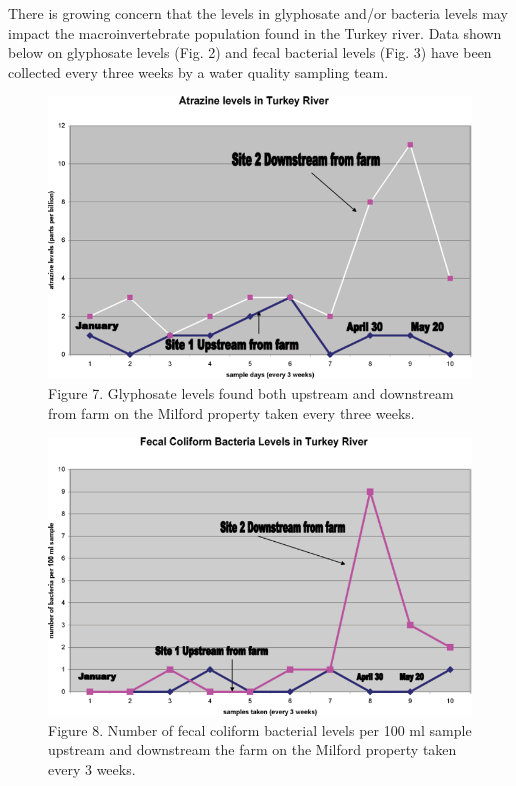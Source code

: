 \documentclass[
]{book}
\begin{document}
There is growing concern that the levels in glyphosate and/or bacteria levels may impact the macroinvertebrate population found in the Turkey river. Data shown below on glyphosate levels (Fig. 2) and fecal bacterial levels (Fig. 3) have been collected every three weeks by a water quality sampling team.

\begin{figure}
\centering
\includegraphics{images/figure7.png}
\caption{Figure 7. Glyphosate levels found both upstream and downstream from farm on the Milford property taken every three weeks.}
\end{figure}

\begin{figure}
\centering
\includegraphics{images/figure8.png}
\caption{Figure 8. Number of fecal coliform bacterial levels per 100 ml sample upstream and downstream the farm on the Milford property taken every 3 weeks.}
\end{figure}
\end{document}
